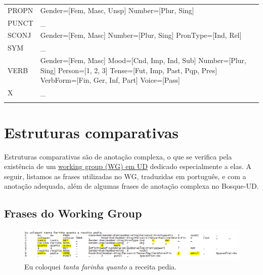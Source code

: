 \documentclass[output=paper,colorlinks,citecolor=brown]{langscibook}
\begin{document}
\begin{longtable}{ p{1.5cm} | p{10cm} }
PROPN & Gender=[Fem, Masc, Unsp] \newline Number=[Plur, Sing] \newline \\
PUNCT & \_ \newline\\
SCONJ & Gender=[Fem, Masc] \newline Number=[Plur, Sing] \newline PronType=[Ind, Rel] \newline \\
SYM & \_ \newline\\
VERB & Gender=[Fem, Masc] \newline Mood=[Cnd, Imp, Ind, Sub] \newline Number=[Plur, Sing] \newline Person=[1, 2, 3] \newline Tense=[Fut, Imp, Past, Pqp, Pres] \newline VerbForm=[Fin, Ger, Inf, Part] \newline Voice=[Pass] \newline \\
X & \_ \\

\label{tab:feats}
\end{longtable}

\section{Estruturas comparativas}

Estruturas comparativas são de anotação complexa, o que se verifica pela existência de um \href{https://universaldependencies.org/workgroups/comparatives.html}{working group (WG) em UD} dedicado especialmente a elas. A seguir, listamos as frases utilizadas no WG, traduzidas em português, e com a anotação adequada, além de algumas frases de anotação complexa no Bosque-UD.

\subsection{Frases do Working Group}

\begin{figure}
    \centering
    \includegraphics[width=\textwidth,height=\textheight,keepaspectratio]{imagesDrive/image20.png}
    \caption{Eu coloquei \emph{tanta farinha quanto} a receita pedia.}
    \label{fig:comparative1}
    \end{figure}{}
\end{document}
